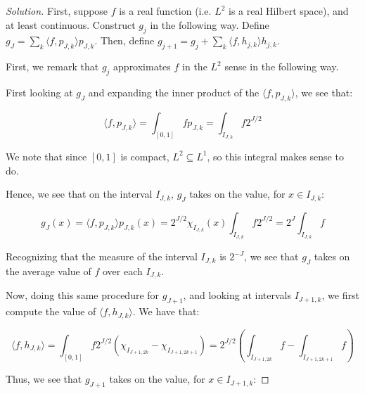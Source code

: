 \documentclass[10pt]{article}
\begin{document}
\begin{proof}[Solution]

First, suppose $f$ is a real function (i.e. $L^2$ is a real Hilbert space), and at least continuous. Construct $g_j$ in the following way. Define $g_J = \sum_{k} \langle f, p_{J,k} \rangle p_{J,k}$. Then, define $g_{j+1} = g_{j} + \sum_{k} \langle f, h_{j, k} \rangle h_{j,k}$. 

First, we remark that $g_j$ approximates $f$ in the $L^2$ sense in the following way. %




First looking at $g_J$ and expanding the inner product of the $\langle f, p_{J,k}\rangle$, we see that:

$$ \langle f, p_{J,k} \rangle =  \int_{[0,1]} f p_{J,k} = \int_{I_{J,k}} f 2^{J/2} $$

We note that since $[0,1]$ is compact, $L^2 \subseteq L^1$, so this integral makes sense to do.

Hence, we see that on the interval $I_{J,k}$, $g_J$ takes on the value, for $x \in I_{J,k}$:

$$g_J(x) =  \langle f, p_{J,k} \rangle p_{J,k}(x) = 2^{J/2}\chi_{I_{J,k}}(x) \int_{I_{J,k}} f 2^{J/2} = 2^J \int_{I_{J,k}} f  $$

Recognizing that the measure of the interval $I_{J,k}$ is $2^{-J}$, we see that $g_J$ takes on the average value of $f$ over each $I_{J,k}$.

Now, doing this same procedure for $g_{J+1}$, and looking at intervals $I_{J+1,k}$, we first compute the value of $\langle f, h_{J, k} \rangle$. We have that:

$$\langle f, h_{J,k} \rangle = \int_{[0,1]} f 2^{J/2} (\chi_{I_{J+1, 2k}} - \chi_{I_{J+1, 2k+1}} ) = 2^{J/2} \left( \int_{I_{J+1, 2k}} f - \int_{I_{J+1, 2k+1}} f \right)$$

Thus, we see that $g_{J+1}$ takes on the value, for $x \in I_{J+1, k}$:


\end{proof}
\end{document}
